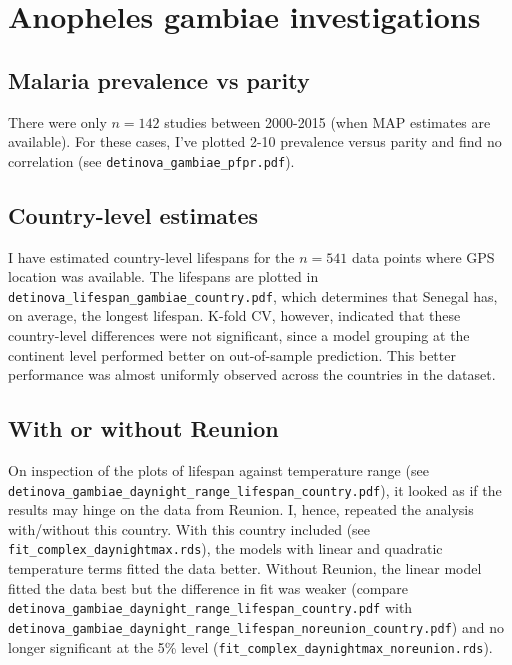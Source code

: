 \documentclass[]{article}
\begin{document}
\section{Anopheles gambiae investigations}
\subsection{Malaria prevalence vs parity}
There were only $n=142$ studies between 2000-2015 (when MAP estimates are available). For these cases, I've plotted 2-10 prevalence versus parity and find no correlation (see \verb|detinova_gambiae_pfpr.pdf|).

\subsection{Country-level estimates}
I have estimated country-level lifespans for the $n=541$ data points where GPS location was available. The lifespans are plotted in \verb|detinova_lifespan_gambiae_country.pdf|, which determines that Senegal has, on average, the longest lifespan. K-fold CV, however, indicated that these country-level differences were not significant, since a model grouping at the continent level performed better on out-of-sample prediction. This better performance was almost uniformly observed across the countries in the dataset.

\subsection{With or without Reunion}
On inspection of the plots of lifespan against temperature range (see \verb|detinova_gambiae_daynight_range_lifespan_country.pdf|), it looked as if the results may hinge on the data from Reunion. I, hence, repeated the analysis with/without this country. With this country included (see \verb|fit_complex_daynightmax.rds|), the models with linear and quadratic temperature terms fitted the data better. Without Reunion, the linear model fitted the data best but the difference in fit was weaker (compare \verb|detinova_gambiae_daynight_range_lifespan_country.pdf| with \verb|detinova_gambiae_daynight_range_lifespan_noreunion_country.pdf|) and no longer significant at the 5\% level (\verb|fit_complex_daynightmax_noreunion.rds|).
\end{document}
